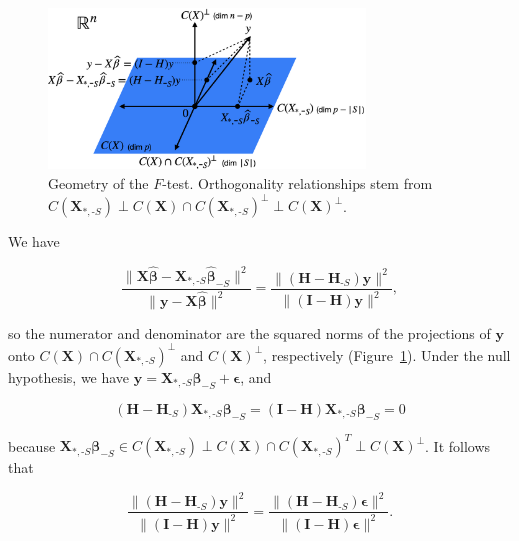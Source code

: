 \documentclass[
  11pt,
  letterpaper,
  oneside]{book}
\theoremstyle{definition}
\theoremstyle{plain}
\theoremstyle{plain}
\theoremstyle{plain}
\theoremstyle{remark}
\begin{document}
\begin{figure}

{\centering \includegraphics[width=0.75\textwidth,height=\textheight]{figures/F-test-geometry.png}

}

\caption{\label{fig-f-test-geometry}Geometry of the \(F\)-test.
Orthogonality relationships stem from
\(C(\boldsymbol{X}_{*,\text{-}S}) \perp C(\boldsymbol{X}) \cap C(\boldsymbol{X}_{*, \text{-}S})^\perp \perp C(\boldsymbol{X})^\perp\).}

\end{figure}

We have

\[
\frac{\|\boldsymbol{X} \boldsymbol{\widehat{\beta}} - \boldsymbol{X}_{*, \text{-}S} \boldsymbol{\widehat{\beta}}_{-S}\|^2}{\|\boldsymbol{y} - \boldsymbol{X} \boldsymbol{\widehat{\beta}}\|^2} = \frac{\|(\boldsymbol{H} - \boldsymbol{H}_{\text{-}S}) \boldsymbol{y}\|^2}{\|(\boldsymbol{I} - \boldsymbol{H}) \boldsymbol{y}\|^2},
\]

so the numerator and denominator are the squared norms of the
projections of \(\boldsymbol{y}\) onto
\(C(\boldsymbol{X}) \cap C(\boldsymbol{X}_{*, \text{-}S})^\perp\) and
\(C(\boldsymbol{X})^\perp\), respectively
(Figure~\ref{fig-f-test-geometry}). Under the null hypothesis, we have
\(\boldsymbol{y} = \boldsymbol{X}_{*, \text{-}S} \boldsymbol{\beta}_{-S} + \boldsymbol{\epsilon}\),
and

\[
(\boldsymbol{H} - \boldsymbol{H}_{\text{-}S}) \boldsymbol{X}_{*,\text{-}S} \boldsymbol{\beta}_{-S} = (\boldsymbol{I} - \boldsymbol{H}) \boldsymbol{X}_{*,\text{-}S} \boldsymbol{\beta}_{-S} = 0
\]

because
\(\boldsymbol{X}_{*, \text{-}S} \boldsymbol{\beta}_{-S} \in C(\boldsymbol{X}_{*, \text{-}S}) \perp C(\boldsymbol{X}) \cap C(\boldsymbol{X}_{*, \text{-}S})^T \perp C(\boldsymbol{X})^\perp\).
It follows that

\[
\frac{\|(\boldsymbol{H} - \boldsymbol{H}_{\text{-}S}) \boldsymbol{y}\|^2}{\|(\boldsymbol{I} - \boldsymbol{H}) \boldsymbol{y}\|^2} = \frac{\|(\boldsymbol{H} - \boldsymbol{H}_{\text{-}S}) \boldsymbol{\epsilon}\|^2}{\|(\boldsymbol{I} - \boldsymbol{H}) \boldsymbol{\epsilon}\|^2}.
\]
\end{document}

